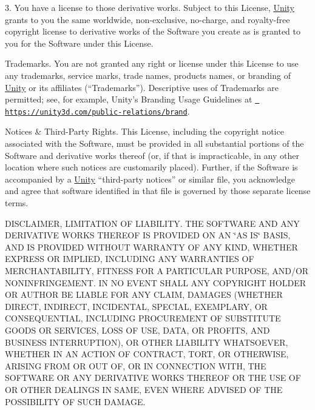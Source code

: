 3. You have a license to those derivative works. Subject to this License, \mbox{\hyperlink{namespace_unity}{Unity}} grants to you the same worldwide, non-\/exclusive, no-\/charge, and royalty-\/free copyright license to derivative works of the Software you create as is granted to you for the Software under this License.


\begin{DoxyEnumerate}
\item Trademarks. You are not granted any right or license under this License to use any trademarks, service marks, trade names, products names, or branding of \mbox{\hyperlink{namespace_unity}{Unity}} or its affiliates (“\+Trademarks”). Descriptive uses of Trademarks are permitted; see, for example, Unity’s Branding Usage Guidelines at \href{https://unity3d.com/public-relations/brand}{\texttt{ https\+://unity3d.\+com/public-\/relations/brand}}.
\item Notices \& Third-\/\+Party Rights. This License, including the copyright notice associated with the Software, must be provided in all substantial portions of the Software and derivative works thereof (or, if that is impracticable, in any other location where such notices are customarily placed). Further, if the Software is accompanied by a \mbox{\hyperlink{namespace_unity}{Unity}} “third-\/party notices” or similar file, you acknowledge and agree that software identified in that file is governed by those separate license terms.
\item D\+I\+S\+C\+L\+A\+I\+M\+ER, L\+I\+M\+I\+T\+A\+T\+I\+ON OF L\+I\+A\+B\+I\+L\+I\+TY. T\+HE S\+O\+F\+T\+W\+A\+RE A\+ND A\+NY D\+E\+R\+I\+V\+A\+T\+I\+VE W\+O\+R\+KS T\+H\+E\+R\+E\+OF IS P\+R\+O\+V\+I\+D\+ED ON AN \char`\"{}\+A\+S I\+S\char`\"{} B\+A\+S\+IS, A\+ND IS P\+R\+O\+V\+I\+D\+ED W\+I\+T\+H\+O\+UT W\+A\+R\+R\+A\+N\+TY OF A\+NY K\+I\+ND, W\+H\+E\+T\+H\+ER E\+X\+P\+R\+E\+SS OR I\+M\+P\+L\+I\+ED, I\+N\+C\+L\+U\+D\+I\+NG A\+NY W\+A\+R\+R\+A\+N\+T\+I\+ES OF M\+E\+R\+C\+H\+A\+N\+T\+A\+B\+I\+L\+I\+TY, F\+I\+T\+N\+E\+SS F\+OR A P\+A\+R\+T\+I\+C\+U\+L\+AR P\+U\+R\+P\+O\+SE, A\+N\+D/\+OR N\+O\+N\+I\+N\+F\+R\+I\+N\+G\+E\+M\+E\+NT. IN NO E\+V\+E\+NT S\+H\+A\+LL A\+NY C\+O\+P\+Y\+R\+I\+G\+HT H\+O\+L\+D\+ER OR A\+U\+T\+H\+OR BE L\+I\+A\+B\+LE F\+OR A\+NY C\+L\+A\+IM, D\+A\+M\+A\+G\+ES (W\+H\+E\+T\+H\+ER D\+I\+R\+E\+CT, I\+N\+D\+I\+R\+E\+CT, I\+N\+C\+I\+D\+E\+N\+T\+AL, S\+P\+E\+C\+I\+AL, E\+X\+E\+M\+P\+L\+A\+RY, OR C\+O\+N\+S\+E\+Q\+U\+E\+N\+T\+I\+AL, I\+N\+C\+L\+U\+D\+I\+NG P\+R\+O\+C\+U\+R\+E\+M\+E\+NT OF S\+U\+B\+S\+T\+I\+T\+U\+TE G\+O\+O\+DS OR S\+E\+R\+V\+I\+C\+ES, L\+O\+SS OF U\+SE, D\+A\+TA, OR P\+R\+O\+F\+I\+TS, A\+ND B\+U\+S\+I\+N\+E\+SS I\+N\+T\+E\+R\+R\+U\+P\+T\+I\+ON), OR O\+T\+H\+ER L\+I\+A\+B\+I\+L\+I\+TY W\+H\+A\+T\+S\+O\+E\+V\+ER, W\+H\+E\+T\+H\+ER IN AN A\+C\+T\+I\+ON OF C\+O\+N\+T\+R\+A\+CT, T\+O\+RT, OR O\+T\+H\+E\+R\+W\+I\+SE, A\+R\+I\+S\+I\+NG F\+R\+OM OR O\+UT OF, OR IN C\+O\+N\+N\+E\+C\+T\+I\+ON W\+I\+TH, T\+HE S\+O\+F\+T\+W\+A\+RE OR A\+NY D\+E\+R\+I\+V\+A\+T\+I\+VE W\+O\+R\+KS T\+H\+E\+R\+E\+OF OR T\+HE U\+SE OF OR O\+T\+H\+ER D\+E\+A\+L\+I\+N\+GS IN S\+A\+ME, E\+V\+EN W\+H\+E\+RE A\+D\+V\+I\+S\+ED OF T\+HE P\+O\+S\+S\+I\+B\+I\+L\+I\+TY OF S\+U\+CH D\+A\+M\+A\+GE.

\end{DoxyEnumerate}
